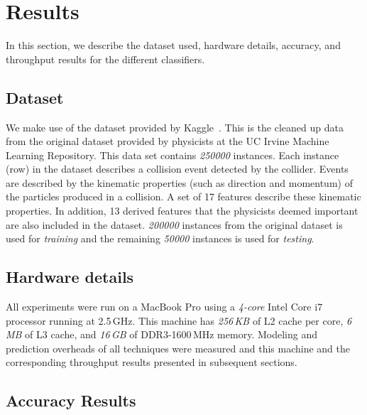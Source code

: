 \section{Results}
\label{sec:results}

In this section, we describe the dataset used, hardware details, accuracy, and throughput results for the different classifiers.

\subsection{Dataset}

We make use of the dataset provided by Kaggle~\cite{Kaggle}. This is the cleaned up data from the original dataset provided by physicists at the UC Irvine Machine Learning Repository. This data set contains \emph{250000} instances. Each instance (row) in the dataset describes a collision event detected by the collider. Events are described by the kinematic properties (such as direction and momentum) of the particles produced in a collision. A set of 17 features describe these kinematic properties. In addition, 13 derived features that the physicists deemed important are also included in the dataset. \emph{200000} instances from the original dataset is used for \emph{training} and the remaining \emph{50000} instances is used for \emph{testing}.

\subsection{Hardware details}

All experiments were run on a MacBook Pro using a \emph{4-core} Intel Core i7 processor running at 2.5\,GHz. This machine has \emph{256\,KB} of L2 cache per core, \emph{6\,MB} of L3 cache, and \emph{16\,GB} of DDR3-1600\,MHz memory. Modeling and prediction overheads of all techniques were measured and this machine and the corresponding throughput results presented in subsequent sections.

\subsection{Accuracy Results}

